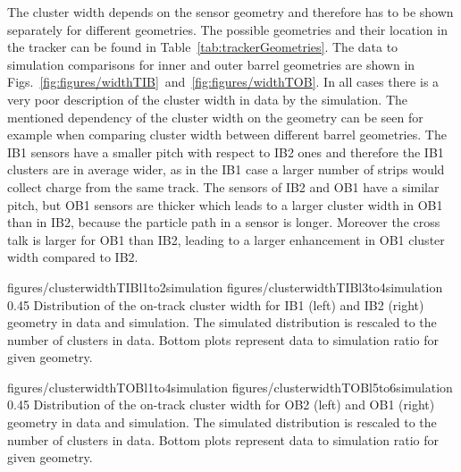 The cluster width depends on the sensor geometry and therefore has to be shown separately for different geometries. The possible geometries and their location in the tracker can be found in Table~\ref{tab:trackerGeometries}. The data to simulation comparisons for inner and outer barrel geometries are shown in Figs.~\ref{fig:figures/widthTIB}~and~\ref{fig:figures/widthTOB}. In all cases there is a very poor description of the cluster width in data by the simulation. The mentioned dependency of the cluster width on the geometry can be seen for example when comparing cluster width between different barrel geometries. The IB1 sensors have a smaller pitch with respect to IB2 ones and therefore the IB1 clusters are in average wider, as in the IB1 case a larger number of strips would collect charge from the same track. The sensors of IB2 and OB1 have a similar pitch, but OB1 sensors are thicker which leads to a larger cluster width in OB1 than in IB2, because the particle path in a sensor is longer. Moreover the cross talk is larger for OB1 than IB2, leading to a larger enhancement in OB1 cluster width compared to IB2.


                 {figures/clusterwidthTIBl1to2simulation}
                 {figures/clusterwidthTIBl3to4simulation} %
                 {0.45}       %
                 { Distribution of the on-track cluster width for IB1 (left) and IB2 (right) geometry in data and simulation. The simulated distribution is rescaled to the number of clusters in data. Bottom plots represent data to simulation ratio for given geometry. }

                 {figures/clusterwidthTOBl1to4simulation}
                 {figures/clusterwidthTOBl5to6simulation} %
                 {0.45}       %
                 { Distribution of the on-track cluster width for OB2 (left) and OB1 (right) geometry in data and simulation. The simulated distribution is rescaled to the number of clusters in data. Bottom plots represent data to simulation ratio for given geometry. }


